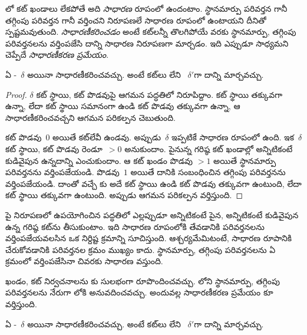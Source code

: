 \documentclass[../../../include/open-logic-section]{subfiles}
\begin{document}


లో కట్ ఖండాలు లేకపోతే అది \emph{సాధారణ} రూపంలో ఉందంటాం. స్థానమార్పు పరివర్తన గానీ తగ్గింపు పరివర్తన గానీ వర్తించని నిరూపణలే సాధారణ రూపంలో ఉంటాయని దీనితో స్పష్టమవుతుంది.  \emph{సాధారణీకరించడం} అంటే కట్‌లన్నీ తొలగిపోయే వరకు స్థానమార్పు, తగ్గింపు పరివర్తనలను వర్తింపజేసి దాన్ని సాధారణ నిరూపణగా మార్చడం. ఇది ఎప్పుడూ సాధ్యమని చెప్పేదే \emph{సాధారణీకరణ ప్రమేయం}.

\begin{thm} ఏ -~$\delta$ అయినా సాధారణీకరించవచ్చు. అంటే కట్‌లు లేని ~$\delta'$గా దాన్ని మార్చవచ్చు.
\end{thm}

\begin{proof}
  $\delta$ కట్ స్థాయి, కట్ పొడవుపై ఆగమన పద్ధతిలో నిరూపిద్దాం. కట్ స్థాయి తక్కువగా ఉన్నా, లేదా కట్ స్థాయి సమానంగా ఉండి కట్ పొడవు తక్కువగా ఉన్నా, ఆ  సాధారణీకరించవచ్చని ఆగమన పరికల్పన చెబుతుంది.

  కట్ పొడవు~$0$ అయితే కట్‌లేవీ ఉండవు. అప్పుడు~$\delta$ ఇప్పటికే సాధారణ రూపంలో ఉంది. ఇక~$\delta$ కట్ స్థాయి, కట్ పొడవు రెండూ~$>
  0$ అనుకుందాం. పైనున్న గరిష్ఠ కట్ ఖండాల్లో అన్నిటికంటే కుడివైపున ఉన్నదాన్ని ఎంచుకుందాం. ఆ కట్ ఖండం పొడవు $>1$ అయితే స్థానమార్పు పరివర్తనను వర్తింపజేయండి. పొడవు~$1$ అయితే దానికి సంబంధించిన తగ్గింపు పరివర్తనను వర్తింపజేయండి. దాంతో వచ్చే కు అదే కట్ స్థాయి ఉండి కట్ పొడవు తక్కువగా ఉంటుంది, లేదా కట్ స్థాయి తక్కువగా ఉంటుంది. అప్పుడు ఆగమన పరికల్పన వర్తిస్తుంది.
\end{proof}

పై నిరూపణలో ఉపయోగించిన పద్ధతిలో ఎల్లప్పుడూ అన్నిటికంటే పైన, అన్నిటికంటే కుడివైపున ఉన్న గరిష్ఠ కట్‌ను తీసుకుంటాం. ఇది సాధారణ రూపంలోకి తేవడానికి పరివర్తనలను వర్తింపజేయవలసిన ఒక నిర్దిష్ట క్రమాన్ని సూచిస్తుంది. ఆశ్చర్యమేమిటంటే, సాధారణ రూపానికి చేరుకోవడానికి పరివర్తనల క్రమం ముఖ్యం కాదు. స్థానమార్పు, తగ్గింపు పరివర్తనలను ఏ క్రమంలో వర్తింపజేసినా చివరకు సాధారణ  వస్తుంది.

ఖండం, కట్ నిర్వచనాలను కు సులభంగా రూపొందించవచ్చు. లోని స్థానమార్పు, తగ్గింపు పరివర్తనలను నేరుగా లోకి అనువదించవచ్చు. అందువల్ల సాధారణీకరణ ప్రమేయం కూ వర్తిస్తుంది.

\begin{thm} ఏ -~$\delta$ అయినా సాధారణీకరించవచ్చు. అంటే కట్‌లు లేని ~$\delta'$గా దాన్ని మార్చవచ్చు.
\end{thm}
\end{document}
